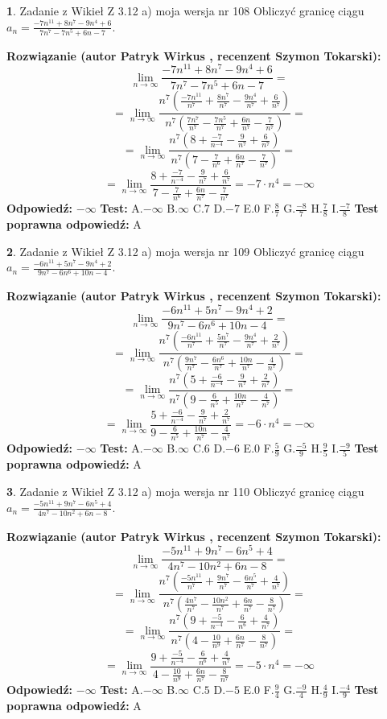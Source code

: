 \documentclass[12pt, a4paper]{article}
\theoremstyle{definition} %
\newtheorem{zad}{}
\newcommand{\zadStart}[1]{\begin{zad}#1\newline}
\newcommand{\zadStop}{\end{zad}}
\newcommand{\rozwStart}[2]{\noindent \textbf{Rozwiązanie (autor #1 , recenzent #2): }\newline}
\newcommand{\rozwStop}{\newline}
\newcommand{\odpStart}{\noindent \textbf{Odpowiedź:}\newline}
\newcommand{\odpStop}{\newline}
\newcommand{\testStart}{\noindent \textbf{Test:}\newline}
\newcommand{\testStop}{\newline}
\newcommand{\kluczStart}{\noindent \textbf{Test poprawna odpowiedź:}\newline}
\newcommand{\kluczStop}{\newline}
\begin{document}
\zadStart{Zadanie z Wikieł Z 3.12 a) moja wersja nr 108}
Obliczyć granicę ciągu $a_{n}=\frac{-7n^{11}+8n^{7}-9n^{4}+6}{7n^{7}-7n^{5}+6n-7}$.
\zadStop
\rozwStart{Patryk Wirkus}{Szymon Tokarski}
$$\lim\limits_{n\to\infty}\frac{-7n^{11}+8n^{7}-9n^{4}+6}{7n^{7}-7n^{5}+6n-7}=$$
$$=\lim\limits_{n\to\infty}\frac{n^{7}\left(\frac{-7n^{11}}{n^{7}}+\frac{8n^{7}}{n^{7}}-\frac{9n^{4}}{n^{7}}+\frac{6}{n^{7}}\right)}{n^{7}\left(\frac{7n^{7}}{n^{7}}-\frac{7n^{5}}{n^{7}}+\frac{6n}{n^{7}}-\frac{7}{n^{7}}\right)}=$$
$$=\lim\limits_{n\to\infty}\frac{n^{7}\left(8+\frac{-7}{n^{-4}}-\frac{9}{n^{7}}+\frac{6}{n^{7}}\right)}
{n^{7}\left(7-\frac{7}{n^{6}}+\frac{6n}{n^{7}}-\frac{7}{n^{7}}\right)}=$$
$$=\lim\limits_{n\to\infty}\frac{8+\frac{-7}{n^{-4}}-\frac{9}{n^{7}}+\frac{6}{n^{7}}}{7-\frac{7}{n^{6}}+\frac{6n}{n^{7}}-\frac{7}{n^{7}}}=-7\cdot n^{4} = -\infty$$
\rozwStop
\odpStart
$-\infty$
\odpStop
\testStart
A.$-\infty$
B.$\infty$
C.$7$
D.$-7$
E.$0$
F.$\frac{8}{7}$
G.$\frac{-8}{7}$
H.$\frac{7}{8}$
I.$\frac{-7}{8}$
\testStop
\kluczStart
A
\kluczStop



\zadStart{Zadanie z Wikieł Z 3.12 a) moja wersja nr 109}
Obliczyć granicę ciągu $a_{n}=\frac{-6n^{11}+5n^{7}-9n^{4}+2}{9n^{7}-6n^{6}+10n-4}$.
\zadStop
\rozwStart{Patryk Wirkus}{Szymon Tokarski}
$$\lim\limits_{n\to\infty}\frac{-6n^{11}+5n^{7}-9n^{4}+2}{9n^{7}-6n^{6}+10n-4}=$$
$$=\lim\limits_{n\to\infty}\frac{n^{7}\left(\frac{-6n^{11}}{n^{7}}+\frac{5n^{7}}{n^{7}}-\frac{9n^{4}}{n^{7}}+\frac{2}{n^{7}}\right)}{n^{7}\left(\frac{9n^{7}}{n^{7}}-\frac{6n^{6}}{n^{7}}+\frac{10n}{n^{7}}-\frac{4}{n^{7}}\right)}=$$
$$=\lim\limits_{n\to\infty}\frac{n^{7}\left(5+\frac{-6}{n^{-4}}-\frac{9}{n^{7}}+\frac{2}{n^{7}}\right)}
{n^{7}\left(9-\frac{6}{n^{5}}+\frac{10n}{n^{7}}-\frac{4}{n^{7}}\right)}=$$
$$=\lim\limits_{n\to\infty}\frac{5+\frac{-6}{n^{-4}}-\frac{9}{n^{7}}+\frac{2}{n^{7}}}{9-\frac{6}{n^{5}}+\frac{10n}{n^{7}}-\frac{4}{n^{7}}}=-6\cdot n^{4} = -\infty$$
\rozwStop
\odpStart
$-\infty$
\odpStop
\testStart
A.$-\infty$
B.$\infty$
C.$6$
D.$-6$
E.$0$
F.$\frac{5}{9}$
G.$\frac{-5}{9}$
H.$\frac{9}{5}$
I.$\frac{-9}{5}$
\testStop
\kluczStart
A
\kluczStop



\zadStart{Zadanie z Wikieł Z 3.12 a) moja wersja nr 110}
Obliczyć granicę ciągu $a_{n}=\frac{-5n^{11}+9n^{7}-6n^{5}+4}{4n^{7}-10n^{2}+6n-8}$.
\zadStop
\rozwStart{Patryk Wirkus}{Szymon Tokarski}
$$\lim\limits_{n\to\infty}\frac{-5n^{11}+9n^{7}-6n^{5}+4}{4n^{7}-10n^{2}+6n-8}=$$
$$=\lim\limits_{n\to\infty}\frac{n^{7}\left(\frac{-5n^{11}}{n^{7}}+\frac{9n^{7}}{n^{7}}-\frac{6n^{5}}{n^{7}}+\frac{4}{n^{7}}\right)}{n^{7}\left(\frac{4n^{7}}{n^{7}}-\frac{10n^{2}}{n^{7}}+\frac{6n}{n^{7}}-\frac{8}{n^{7}}\right)}=$$
$$=\lim\limits_{n\to\infty}\frac{n^{7}\left(9+\frac{-5}{n^{-4}}-\frac{6}{n^{6}}+\frac{4}{n^{7}}\right)}
{n^{7}\left(4-\frac{10}{n^{9}}+\frac{6n}{n^{7}}-\frac{8}{n^{7}}\right)}=$$
$$=\lim\limits_{n\to\infty}\frac{9+\frac{-5}{n^{-4}}-\frac{6}{n^{6}}+\frac{4}{n^{7}}}{4-\frac{10}{n^{9}}+\frac{6n}{n^{7}}-\frac{8}{n^{7}}}=-5\cdot n^{4} = -\infty$$
\rozwStop
\odpStart
$-\infty$
\odpStop
\testStart
A.$-\infty$
B.$\infty$
C.$5$
D.$-5$
E.$0$
F.$\frac{9}{4}$
G.$\frac{-9}{4}$
H.$\frac{4}{9}$
I.$\frac{-4}{9}$
\testStop
\kluczStart
A
\kluczStop
\end{document}
